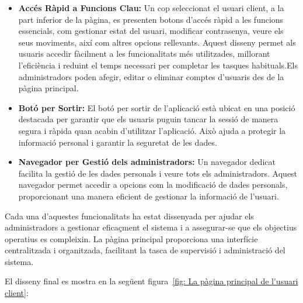 \documentclass[a4paper,12pt,twoside]{ThesisStyle}
\begin{document}
\begin{itemize}

    \item \textbf{Accés Ràpid a Funcions Clau:} Un cop seleccionat el usuari client, a la part inferior de la pàgina, es presenten botons d'accés ràpid a les funcions essencials, com gestionar estat del usuari, modificar contrasenya, veure els seus moviments, així com altres opcions rellevants. Aquest disseny permet als usuaris accedir fàcilment a les funcionalitats més utilitzades, millorant l'eficiència i reduint el temps necessari per completar les tasques habituals.Els administradors poden afegir, editar o eliminar comptes d'usuaris des de la pàgina principal.
    
    \item \textbf{Botó per Sortir:} El botó per sortir de l'aplicació està ubicat en una posició destacada per garantir que els usuaris puguin tancar la sessió de manera segura i ràpida quan acabin d'utilitzar l'aplicació. Això ajuda a protegir la informació personal i garantir la seguretat de les dades.

    \item \textbf{Navegador per Gestió dels administradors:} Un navegador dedicat facilita la gestió de les dades personals i veure tots els administradors. Aquest navegador permet accedir a opcions com la modificació de dades personals, proporcionant una manera eficient de gestionar la informació de l'usuari.

\end{itemize}

Cada una d'aquestes funcionalitats ha estat dissenyada per ajudar els administradors a gestionar eficaçment el sistema i a assegurar-se que els objectius operatius es compleixin. La pàgina principal proporciona una interfície centralitzada i organitzada, facilitant la tasca de supervisió i administració del sistema.

El disseny final es mostra en la següent figura~\ref{fig: La pàgina principal de l'usuari client}:
\end{document}
